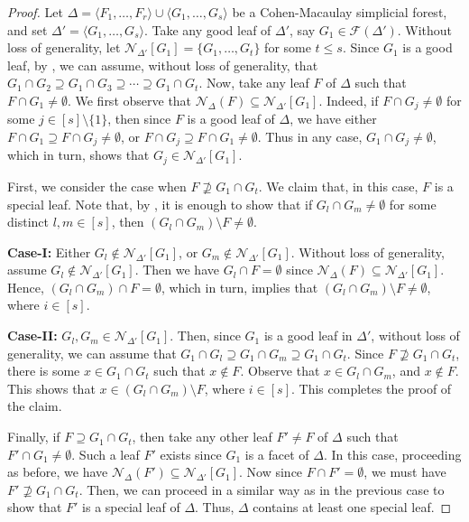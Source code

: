 \documentclass[10pt,a4paper]{amsart}
\def\D{\Delta}
\def\F{\mathcal{F}}
\def\N{\mathcal{N}}
\def\l{\langle}
\def\r{\rangle}
\begin{document}
\begin{proof}
    Let $\Delta=\l F_1,\ldots,F_r\r\cup\l G_1,\ldots,G_s\r$ be a Cohen-Macaulay simplicial forest, and set $\D'=\l G_1,\ldots,G_s\r$. Take any good leaf of $\D'$, say $G_1\in \F(\D')$. Without loss of generality, let $\N_{\D'}[G_1]=\{G_1,\ldots , G_t\}$ for some $t\leq s$. Since $G_1$ is a good leaf, by , we can assume, without loss of generality, that $G_1\cap G_2\supseteq G_1\cap G_3\supseteq \cdots \supseteq G_1\cap G_t$. Now, take any leaf $F$ of $\D$ such that $F\cap G_1\neq \emptyset$. We first observe that $\N_{\D}(F)\subseteq \N_{\D'}[G_1]$. Indeed, if $F\cap G_j\neq \emptyset$ for some $j\in [s]\setminus\{1\}$, then since $F$ is a good leaf of $\D$, we have either $F\cap G_1\supseteq F\cap G_j\neq \emptyset$, or $F\cap G_j\supseteq F\cap G_1\neq \emptyset$. Thus in any case, $G_1\cap G_j\neq \emptyset$, which in turn, shows that $G_j\in \N_{\D'}[G_1]$.
    
    First, we consider the case when $F\nsupseteq G_1\cap G_t$. We claim that, in this case, $F$ is a special leaf. Note that, by , it is enough to show that if $G_l\cap G_m\neq \emptyset$ for some distinct $l,m\in [s]$, then $(G_l\cap G_m)\setminus F\neq \emptyset$. 
    
    \noindent \textbf{Case-I:} Either $G_l\notin \N_{\D'}[G_1]$, or $G_m\notin \N_{\D'}[G_1]$. Without loss of generality, assume $G_l\notin \N_{\D'}[G_1]$. Then we have $G_l\cap F=\emptyset$ since $\N_{\D}(F)\subseteq \N_{\D'}[G_1]$. Hence, $(G_l\cap G_m)\cap F=\emptyset$, which in turn, implies that $(G_l\cap G_m)\setminus F\neq \emptyset$, where $i\in [s]$.
    
     \noindent \textbf{Case-II:} $G_l,G_m\in \N_{\D'}[G_1]$. Then, since $G_1$ is a good leaf in $\D'$, without loss of generality, we can assume that $G_1\cap G_l\supseteq G_1\cap G_m\supseteq G_1\cap G_t$. Since $F\nsupseteq G_1\cap G_t$, there is some $x\in G_1\cap G_t$ such that $x\notin F$. Observe that $x\in G_l\cap G_m$, and $x\notin F$. This shows that $x\in (G_l\cap G_m)\setminus F$, where $i\in [s]$. This completes the proof of the claim.

     \noindent
     Finally, if $F\supseteq G_1\cap G_t$, then take any other leaf $F'\neq F$ of $\D$ such that $F'\cap G_1\neq \emptyset$. Such a leaf $F'$ exists since $G_1$ is a facet of $\D$. In this case, proceeding as before, we have $\N_{\D}(F')\subseteq \N_{\D'}[G_1]$. Now since $F\cap F'=\emptyset$, we must have $F'\nsupseteq G_1\cap G_t$. Then, we can proceed in a similar way as in the previous case to show that $F'$ is a special leaf of $\D$. Thus, $\D$ contains at least one special leaf.
\end{proof}
\end{document}
